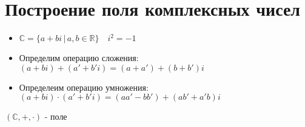 
\section{Построение поля комплексных чисел}
\begin{itemize}
    \item $\mathbb{C} = \{a + bi\,|\, a, b \in \mathbb{R} \} \quad i^2 = -1$ 
    \item Определим операцию сложения: $(a + bi) + (a' + b'i) = (a + a') + (b + b')i$
    \item Определеим операцию умножения: $(a + bi) \cdot (a' + b'i) = (aa' - bb') + (ab' + a'b)i$ 
\end{itemize} 
\begin{theorem-non}
    $(\mathbb{C}, +, \cdot)$ - поле
\end{theorem-non}
